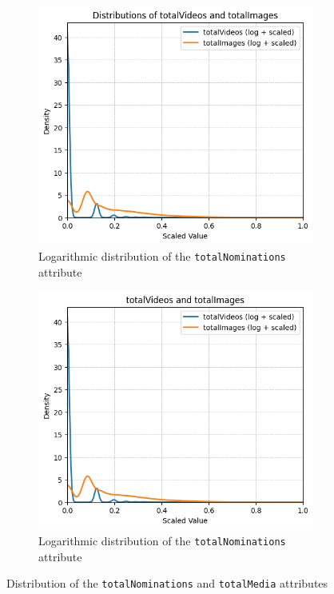 \begin{figure}[H]
    \centering
    \begin{subfigure}{0.48\textwidth}
        \includegraphics[width=\textwidth]{plots/nominations_distrib.png}
        \caption{Logarithmic distribution of the \texttt{totalNominations} attribute}
        \label{fig:sub1}
    \end{subfigure}
    \begin{subfigure}{0.48\textwidth}
        \includegraphics[width=\textwidth]{plots/totalVideos_Images_distrib.png}
        \caption{Logarithmic distribution of the \texttt{totalNominations} attribute}
        \label{fig:sub2}
    \end{subfigure}
    \caption{Distribution of the \texttt{totalNominations} and \texttt{totalMedia} attributes}
    \label{fig:distrib}
\end{figure}



